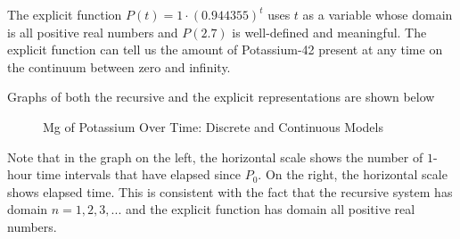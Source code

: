 \documentclass[10pt,]{book}
\theoremstyle{ptxdefinitionnotitle}
\theoremstyle{ptxdefinitiontitle}
\theoremstyle{ptxdefinitionnotitle}
\theoremstyle{ptxdefinitiontitle}
\theoremstyle{ptxdefinitionnotitle}
\theoremstyle{ptxdefinitiontitle}
\numberwithin{equation}{section}
\begin{document}
\begin{example}
\par
\hypertarget{p-104}{}%
The explicit function \(P(t)=1 \cdot (0.944355)^t\) uses \(t\) as a variable whose domain is all positive real numbers and \(P(2.7)\) is well-defined and meaningful. The explicit function can tell us the amount of Potassium-42 present at any time on the continuum between zero and infinity.%
\par
\hypertarget{p-105}{}%
Graphs of both the recursive and the explicit representations are shown below%
\begin{figure}
\centering
\begin{sidebyside}{2}{0}{0}{0}
\begin{sbspanel}{0.5}
\end{sbspanel}
\begin{sbspanel}{0.5}
\end{sbspanel}
\end{sidebyside}
\caption{Mg of Potassium Over Time: Discrete and Continuous Models\label{figure-discrete-p42}}
\end{figure}
\hypertarget{p-106}{}%
Note that in the graph on the left, the horizontal scale shows the number of \(1\)-hour time intervals that have elapsed since \(P_0\). On the right, the horizontal scale shows elapsed time. This is consistent with the fact that the recursive system has domain \(n=1,2,3,...\) and the explicit function has domain all positive real numbers.%
\end{example}
\end{document}
